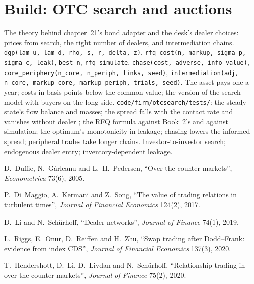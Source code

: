\section{Build: OTC search and auctions}\label{bld:mx:request-for-quote-and-dealer-markets-in-theory:otcsearch}

\begin{build}
 The theory behind chapter~21's bond adapter and the desk's dealer choices: prices from search, the right number of dealers, and
intermediation chains.
 \texttt{dgp(lam\_u, lam\_d, rho, s, r, delta, z)}, \texttt{rfq\_cost(n, markup, sigma\_p, sigma\_c, leak)}, \texttt{best\_n},
\texttt{rfq\_simulate}, \texttt{chase(cost, adverse, info\_value)}, \texttt{core\_periphery(n\_core, n\_periph, links, seed)},
\texttt{intermediation(adj, n\_core, markup\_core, markup\_periph, trials, seed)}.
 The asset pays one a year; costs in basis points below the common value; the version of the search model with buyers on the long side.
 \texttt{code/firm/otcsearch/tests/}: the steady state's flow balance and masses; the spread falls with the contact rate and
vanishes without dealer ; the RFQ formula against Book~2's and against simulation; the optimum's monotonicity in leakage; chasing
lowers the informed spread; peripheral trades take longer chains.
 Investor-to-investor search; endogenous dealer entry; inventory-dependent leakage.
\end{build}

\begin{omsources}
\item D.~Duffie, N.~Gârleanu and L.~H.~Pedersen, ``Over-the-counter markets'', \emph{Econometrica} 73(6), 2005.
\item P.~Di~Maggio, A.~Kermani and Z.~Song, ``The value of trading relations in turbulent times'', \emph{Journal of Financial Economics} 124(2),
2017.
\item D.~Li and N.~Schürhoff, ``Dealer networks'', \emph{Journal of Finance} 74(1), 2019.
\item L.~Riggs, E.~Onur, D.~Reiffen and H.~Zhu, ``Swap trading after Dodd--Frank: evidence from index CDS'', \emph{Journal of Financial Economics}
137(3), 2020.
\item T.~Hendershott, D.~Li, D.~Livdan and N.~Schürhoff, ``Relationship trading in over-the-counter markets'', \emph{Journal of Finance} 75(2), 2020.
\end{omsources}

